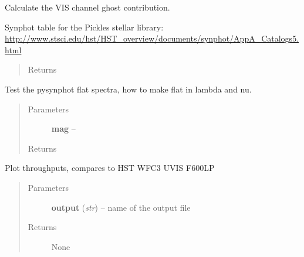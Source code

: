 \documentclass[a4paper,11pt,english]{sphinxmanual}
\begin{document}

\begin{fulllineitems}
\label{ETC:ETC.fluxEstimates.ghostResults}
Calculate the VIS channel ghost contribution.

Synphot table for the Pickles stellar library:
\href{http://www.stsci.edu/hst/HST\_overview/documents/synphot/AppA\_Catalogs5.html}{http://www.stsci.edu/hst/HST\_overview/documents/synphot/AppA\_Catalogs5.html}
\begin{quote}\begin{description}
\item[{Returns}] \leavevmode


\end{description}\end{quote}

\end{fulllineitems}


\begin{fulllineitems}
\label{ETC:ETC.fluxEstimates.testFlatSpectrum}
Test the pysynphot flat spectra, how to make flat in lambda and nu.
\begin{quote}\begin{description}
\item[{Parameters}] \leavevmode
\textbf{mag} -- 

\item[{Returns}] \leavevmode


\end{description}\end{quote}

\end{fulllineitems}


\begin{fulllineitems}
\label{ETC:ETC.fluxEstimates.throughputs}
Plot throughputs, compares to HST WFC3 UVIS F600LP
\begin{quote}\begin{description}
\item[{Parameters}] \leavevmode
\textbf{output} (\emph{str}) -- name of the output file

\item[{Returns}] \leavevmode
None

\end{description}\end{quote}

\end{fulllineitems}
\end{document}

